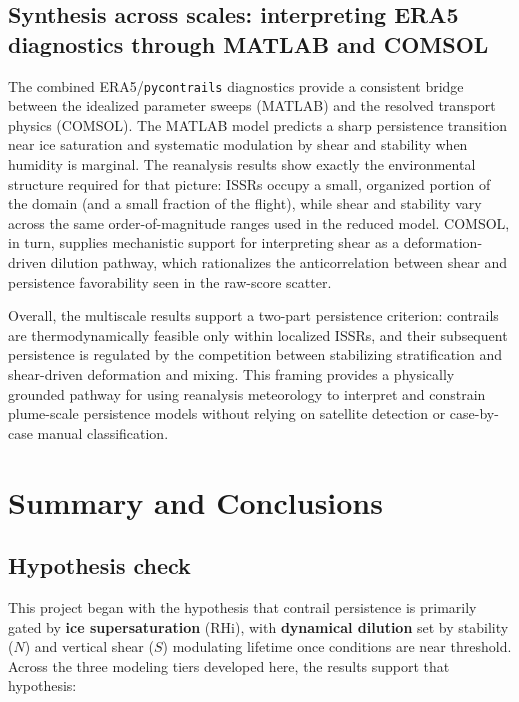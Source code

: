 \documentclass[11pt]{article}
\begin{document}
\subsection{Synthesis across scales: interpreting ERA5 diagnostics through MATLAB and COMSOL}
\label{subsec:multiscale_link}

The combined ERA5/\texttt{pycontrails} diagnostics provide a consistent bridge between the
idealized parameter sweeps (MATLAB) and the resolved transport physics (COMSOL). The MATLAB model
predicts a sharp persistence transition near ice saturation and systematic modulation by shear and
stability when humidity is marginal. The reanalysis results show exactly the environmental
structure required for that picture: ISSRs occupy a small, organized portion of the domain (and a
small fraction of the flight), while shear and stability vary across the same order-of-magnitude
ranges used in the reduced model. COMSOL, in turn, supplies mechanistic support for interpreting
shear as a deformation-driven dilution pathway, which rationalizes the anticorrelation between
shear and persistence favorability seen in the raw-score scatter.

Overall, the multiscale results support a two-part persistence criterion: contrails are
thermodynamically feasible only within localized ISSRs, and their subsequent persistence is
regulated by the competition between stabilizing stratification and shear-driven deformation and
mixing. This framing provides a physically grounded pathway for using reanalysis meteorology to
interpret and constrain plume-scale persistence models without relying on satellite detection or
case-by-case manual classification.
\section{Summary and Conclusions}
\label{sec:conclusions}

\subsection{Hypothesis check}
This project began with the hypothesis that contrail persistence is primarily gated by
\textbf{ice supersaturation} (RHi), with \textbf{dynamical dilution} set by stability ($N$) and
vertical shear ($S$) modulating lifetime once conditions are near threshold. Across the three
modeling tiers developed here, the results support that hypothesis:
\end{document}
